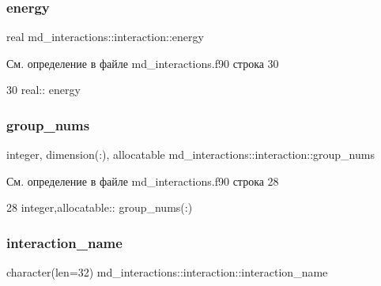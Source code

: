 \subsubsection{\texorpdfstring{energy}{energy}}
{\footnotesize\ttfamily real md\+\_\+interactions\+::interaction\+::energy}



См. определение в файле md\+\_\+interactions.\+f90 строка 30


\begin{DoxyCode}
30     \textcolor{keywordtype}{real}:: energy
\end{DoxyCode}
\mbox{\label{structmd__interactions_1_1interaction_a7780370c71abfd1418aba1cc0037f2d1}} 
\subsubsection{\texorpdfstring{group\+\_\+nums}{group\_nums}}
{\footnotesize\ttfamily integer, dimension(\+:), allocatable md\+\_\+interactions\+::interaction\+::group\+\_\+nums}



См. определение в файле md\+\_\+interactions.\+f90 строка 28


\begin{DoxyCode}
28     \textcolor{keywordtype}{integer},\textcolor{keywordtype}{allocatable}:: group\_nums(:)
\end{DoxyCode}
\mbox{\label{structmd__interactions_1_1interaction_a098dcff72c607d6b5e6a4f0f522b56ed}} 
\subsubsection{\texorpdfstring{interaction\+\_\+name}{interaction\_name}}
{\footnotesize\ttfamily character(len=32) md\+\_\+interactions\+::interaction\+::interaction\+\_\+name}



